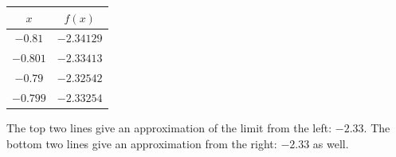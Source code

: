 \begin{enumialphparenastyle}
\begin{ex}
\begin{sol}
{\begin{tabular}{cc}
$x$ & $f(x)$ \\ \hline 
$-0.81 $& $-2.34129$ \\
$ -0.801$ & $-2.33413$ \\
$ -0.79 $& $-2.32542 $\\
$ -0.799$ & $-2.33254$
\end{tabular}

The top two lines give an approximation of the limit from the left: $-2.33$. The bottom two lines give an approximation from the right: $-2.33$ as well.
}
\end{sol}
\end{ex}


\end{enumialphparenastyle}

